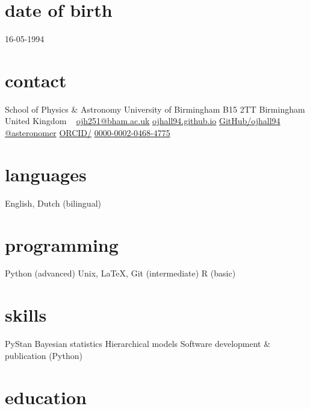 \documentclass[]{k-cv} %
\begin{document}


\begin{aside} %
\section{date of birth}
\color{gray}16-05-1994
\section{contact}
School of Physics \& Astronomy
University of Birmingham
B15 2TT
Birmingham
United Kingdom
~
\href{mailto:ojh251@student.bham.ac.uk}{ojh251@bham.ac.uk}
\href{http://www.ojhall94.github.io}{ojhall94.github.io}
\href{http://www.github.com/ojhall94}{GitHub/ojhall94}
\href{http://www.twitter.com/asteronomer}{@asteronomer}
\href{http://www.orcid.com/0000-0002-0468-4775}{ORCID/}
\href{http://www.orcid.com/0000-0002-0468-4775}{0000-0002-0468-4775}
\section{languages}
English, Dutch (bilingual)
\section{programming}
Python (advanced)
Unix, LaTeX, Git (intermediate)
R (basic)
\section{skills}
PyStan
Bayesian statistics
Hierarchical models
Software development \& publication (Python)
\end{aside}


\section{education}
\end{document}
